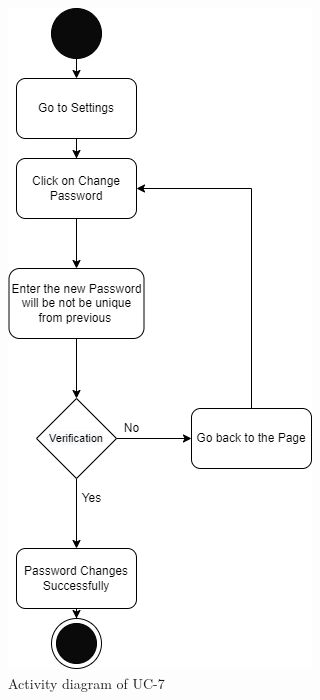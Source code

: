 \begin{figure}[H]
    \centering
    \includegraphics[scale=0.7]{./diagrams/Activity Diagram/ad-05.png}
    \caption{Activity diagram of UC-7}
    \label{fig:act-05}

\end{figure}


